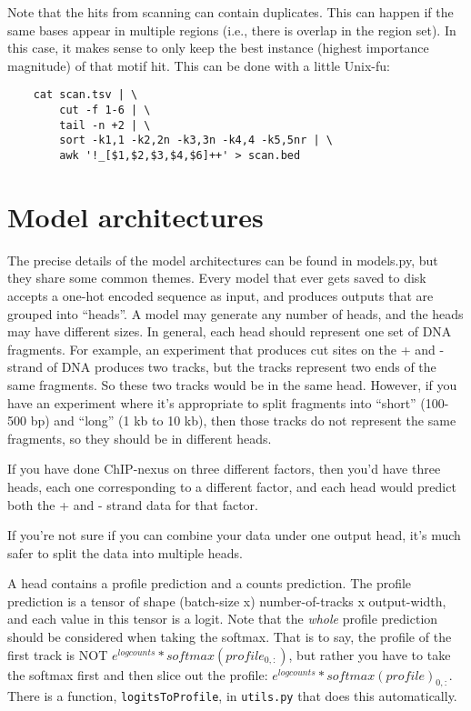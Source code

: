\documentclass{article}
\begin{document}


Note that the hits from scanning can contain duplicates.
This can happen if the same bases appear in multiple regions (i.e., there is
overlap in the region set).
In this case, it makes sense to only keep the best instance (highest importance
magnitude) of that motif hit.
This can be done with a little Unix-fu:

\begin{lstlisting}
    cat scan.tsv | \
        cut -f 1-6 | \
        tail -n +2 | \
        sort -k1,1 -k2,2n -k3,3n -k4,4 -k5,5nr | \
        awk '!_[$1,$2,$3,$4,$6]++' > scan.bed
\end{lstlisting}
\newpage
\section{Model architectures}\label{sec:modelArchitectures}

The precise details of the model architectures can be found in models.py, but
they share some common themes.
Every model that ever gets saved to disk accepts a one-hot encoded sequence as
input, and produces outputs that are grouped into ``heads''.
A model may generate any number of heads, and the heads may have different
sizes.
In general, each head should represent one set of DNA fragments.
For example, an experiment that produces cut sites on the + and - strand of DNA
produces two tracks, but the tracks represent two ends of the same fragments.
So these two tracks would be in the same head.
However, if you have an experiment where it's appropriate to split fragments into
``short'' (100-500 bp) and ``long'' (1 kb to 10 kb), then those tracks do not
represent the same fragments, so they should be in different heads.

If you have done ChIP-nexus on three different factors, then you'd have three
heads, each one corresponding to a different factor, and each head would predict
both the + and - strand data for that factor.

If you're not sure if you can combine your data under one output head, it's much
safer to split the data into multiple heads.

A head contains a profile prediction and a counts prediction.
The profile prediction is a tensor of shape
(batch-size x) number-of-tracks x output-width, and each value in this tensor
is a logit.
Note that the \emph{whole} profile prediction should be considered when taking
the softmax.
That is to say, the profile of the first track is NOT
$e^{logcounts} * softmax(profile_{0,:})$, but rather you have to take the
softmax first and then slice out the profile:
$e^{logcounts} * softmax(profile)_{0,:}$.
There is a function, \texttt{logitsToProfile}, in \texttt{utils.py} that does
this automatically.
\end{document}
